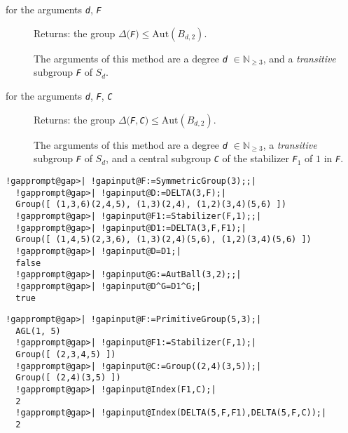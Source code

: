 \documentclass[a4paper,11pt]{report}
\begin{document}
{{{ 

 
\begin{description}
\item[{for the arguments \mbox{\texttt{\mdseries\slshape d}}, \mbox{\texttt{\mdseries\slshape F}}}]  Returns: the group $\Delta($\mbox{\texttt{\mdseries\slshape F}}$)\le\mathrm{Aut}(B_{d,2})$. 

 The arguments of this method are a degree \mbox{\texttt{\mdseries\slshape d}} $\in\mathbb{N}_{\ge 3}$, and a \emph{transitive} subgroup \mbox{\texttt{\mdseries\slshape F}} of $S_{d}$. 
\item[{for the arguments \mbox{\texttt{\mdseries\slshape d}}, \mbox{\texttt{\mdseries\slshape F}}, \mbox{\texttt{\mdseries\slshape C}}}]  Returns: the group $\Delta($\mbox{\texttt{\mdseries\slshape F}}$,$\mbox{\texttt{\mdseries\slshape C}}$)\le\mathrm{Aut}(B_{d,2})$. 

 The arguments of this method are a degree \mbox{\texttt{\mdseries\slshape d}} $\in\mathbb{N}_{\ge 3}$, a \emph{transitive} subgroup \mbox{\texttt{\mdseries\slshape F}} of $S_d$, and a central subgroup \mbox{\texttt{\mdseries\slshape C}} of the stabilizer \mbox{\texttt{\mdseries\slshape F}}$_{1}$ of $1$ in \mbox{\texttt{\mdseries\slshape F}}. 
\end{description}
 

 }

 

 
\begin{Verbatim}[commandchars=!@|,fontsize=\small,frame=single,label=Example]
  !gapprompt@gap>| !gapinput@F:=SymmetricGroup(3);;|
  !gapprompt@gap>| !gapinput@D:=DELTA(3,F);|
  Group([ (1,3,6)(2,4,5), (1,3)(2,4), (1,2)(3,4)(5,6) ])
  !gapprompt@gap>| !gapinput@F1:=Stabilizer(F,1);;|
  !gapprompt@gap>| !gapinput@D1:=DELTA(3,F,F1);|
  Group([ (1,4,5)(2,3,6), (1,3)(2,4)(5,6), (1,2)(3,4)(5,6) ])
  !gapprompt@gap>| !gapinput@D=D1;|
  false
  !gapprompt@gap>| !gapinput@G:=AutBall(3,2);;|
  !gapprompt@gap>| !gapinput@D^G=D1^G;|
  true
\end{Verbatim}
 

 
\begin{Verbatim}[commandchars=!@|,fontsize=\small,frame=single,label=Example]
  !gapprompt@gap>| !gapinput@F:=PrimitiveGroup(5,3);|
  AGL(1, 5)
  !gapprompt@gap>| !gapinput@F1:=Stabilizer(F,1);|
  Group([ (2,3,4,5) ])
  !gapprompt@gap>| !gapinput@C:=Group((2,4)(3,5));|
  Group([ (2,4)(3,5) ])
  !gapprompt@gap>| !gapinput@Index(F1,C);|
  2
  !gapprompt@gap>| !gapinput@Index(DELTA(5,F,F1),DELTA(5,F,C));|
  2
\end{Verbatim}
 

}}
\end{document}
